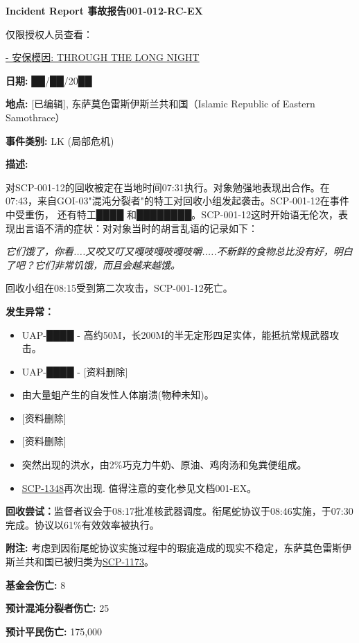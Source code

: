 \documentclass[openany,a4paper]{book} %
\begin{document}
\vspace{20pt}

\textbf{Incident Report 事故报告001-012-RC-EX}

{\tiny{仅限授权人员查看：}}
\begin{colorboxed}
{\color{red}\uline{- 安保模因: THROUGH THE LONG NIGHT}}\vspace{12pt}

\textbf{日期:} ██/██/20██\vspace{12pt}

\textbf{地点: }[已编辑], 东萨莫色雷斯伊斯兰共和国（Islamic Republic of Eastern Samothrace）\vspace{12pt}

\textbf{事件类别: }LK (局部危机)\vspace{12pt}

\textbf{描述:}

对SCP-001-12的回收被定在当地时间07:31执行。对象勉强地表现出合作。在07:43，来自GOI-03"混沌分裂者"的特工对回收小组发起袭击。SCP-001-12在事件中受重伤， 还有特工████ 和████████。SCP-001-12这时开始语无伦次，表现出言语不清的症状：对对象当时的胡言乱语的记录如下：\vspace{12pt}

\textit{它们饿了，你看....又咬又叮又嘎吱嘎吱嘎吱嚼.....不新鲜的食物总比没有好，明白了吧？它们非常饥饿，而且会越来越饿。}\vspace{12pt}

回收小组在08:15受到第二次攻击，SCP-001-12死亡。\vspace{12pt}

\textbf{发生异常：}

\begin{itemize}
  \item UAP-████ - 高约50M，长200M的半无定形四足实体，能抵抗常规武器攻击。
  \item UAP-████ - [资料删除]
  \item 由大量蛆产生的自发性人体崩溃(物种未知)。
  \item {[资料删除]}
  \item {[资料删除]}
  \item 突然出现的洪水，由2\%巧克力牛奶、原油、鸡肉汤和兔粪便组成。
  \item \hyperref[chap:SCP-1348]{SCP-1348}再次出现. 值得注意的变化参见文档001-EX。
\end{itemize}\vspace{12pt}

\textbf{回收尝试：}监督者议会于08:17批准核武器调度。衔尾蛇协议于08:46实施，于07:30 完成。协议以61\%有效效率被执行。\vspace{12pt}

\textbf{附注: }考虑到因衔尾蛇协议实施过程中的瑕疵造成的现实不稳定，东萨莫色雷斯伊斯兰共和国已被归类为\hyperref[chap:SCP-1173]{SCP-1173}。\vspace{12pt}

\textbf{基金会伤亡:} 8

\textbf{预计混沌分裂者伤亡:} 25

\textbf{预计平民伤亡: }175,000
\end{colorboxed}
\end{document}

